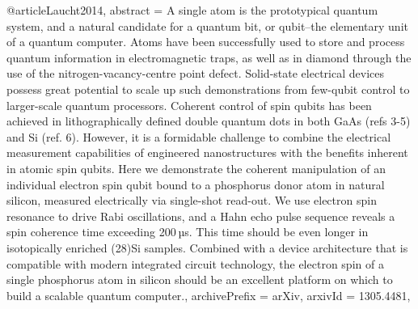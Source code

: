 @article{Laucht2014,
abstract = {A single atom is the prototypical quantum system, and a natural candidate for a quantum bit, or qubit--the elementary unit of a quantum computer. Atoms have been successfully used to store and process quantum information in electromagnetic traps, as well as in diamond through the use of the nitrogen-vacancy-centre point defect. Solid-state electrical devices possess great potential to scale up such demonstrations from few-qubit control to larger-scale quantum processors. Coherent control of spin qubits has been achieved in lithographically defined double quantum dots in both GaAs (refs 3-5) and Si (ref. 6). However, it is a formidable challenge to combine the electrical measurement capabilities of engineered nanostructures with the benefits inherent in atomic spin qubits. Here we demonstrate the coherent manipulation of an individual electron spin qubit bound to a phosphorus donor atom in natural silicon, measured electrically via single-shot read-out. We use electron spin resonance to drive Rabi oscillations, and a Hahn echo pulse sequence reveals a spin coherence time exceeding 200 µs. This time should be even longer in isotopically enriched (28)Si samples. Combined with a device architecture that is compatible with modern integrated circuit technology, the electron spin of a single phosphorus atom in silicon should be an excellent platform on which to build a scalable quantum computer.},
archivePrefix = {arXiv},
arxivId = {1305.4481},
}
